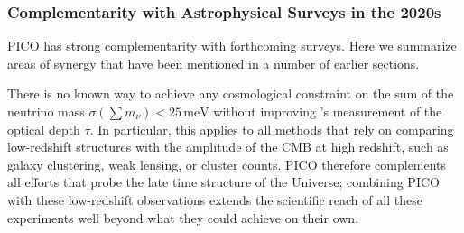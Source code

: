 \documentclass[PICOReport.tex]{subfiles}
\begin{document}

\subsubsection{Complementarity with Astrophysical Surveys in the 2020s}

PICO has strong complementarity with forthcoming surveys. Here we summarize areas of synergy that have been mentioned in a number of earlier sections. 

There is no known way to achieve any cosmological constraint on the sum of the neutrino mass $\sigma(\sum m_\nu)<25\,\mathrm{meV}$ without improving \planck 's measurement of the optical depth $\tau$. In particular, this applies to all methods that rely on comparing low-redshift structures with the amplitude of the CMB at high redshift, such as galaxy clustering, weak lensing, or cluster counts. PICO therefore complements all efforts that probe the late time structure of the Universe; combining PICO with these low-redshift observations extends the scientific reach of all these experiments well beyond what they could achieve on their own.

 
\end{document}
